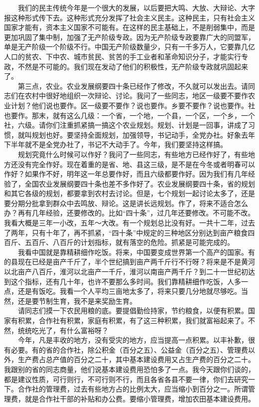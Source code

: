 \documentclass[cn,11pt,chinese]{elegantbook}
\begin{document}
　　我们的民主传统今年是一个很大的发展，以后要把大鸣、大放、大辩论、大字报这种形式传下去。这种形式充分发挥了社会主义民主。这种民主，只有社会主义国家才能有，资本主义国家不可能有。在这样的民主基础上，不是削弱集中，而是更加巩固了集中制，加强了无产阶级专政。因为无产阶级专政要靠广大的同盟军，单是无产阶级一个阶级不行。中国无产阶级数量少，只有一千多万人，它要靠几亿人口的贫农、下中农、城市贫民、贫苦的手工业者和革命知识分子，才能实行专政，不然是不可能的。我们现在发动了他们的积极性，无产阶级专政就巩固起来了。\\
　　第三点，农业。农业发展纲要四十条已经作了修改，不久就可以发出去。请同志们在农村中很好地组织一次辩论、讨论。我问了一些同志，地区一级要不要作农业计划？他们说也要作。区一级要不要作？说也要作。乡要不要作？说也要作。社也要作。那末，就有这么几级：一个省，一个地，一个县，一个区，一个乡，一个社，六级。请你们注重抓紧搞一搞这个农业规划。规划、计划是一回事，讲成了习惯，就叫规划也好。要坚持全面规划，加强领导，书记动手，全党办社。好象去年下半年就不是全党办社了，书记不大动手了。今年，我们要坚持这样搞。\\
　　规划究竟什么时候可以作好？我问了一些同志，有些地方已经作好了，有些地方还没有完全作好。现在着重的是省、地、县这三级，是不是在今冬或者明春可以作好？如果作不好，明年这一年总要作好，而且六级都要作好。因为我们有几年经验了，全国农业发展纲要四十条也差不多作好了。农业发展纲要四十条，省的规划和其它各级的规划，都要拿到农村去讨论。但是，七个规划一起讨论太多了，还是要分期分批拿到群众中去鸣放、辩论。这是讲长远规划。作了，将来不适合怎么办？再有几年经验，还要修改的。比如“四十条”，过几年还要修改。不可能不改。我看大概是三年一小改，五年～大改。有一个规划总比没有好。一共十二年，过去了两年，只有十年了，再不抓紧，“四十条”中规定的三种地区分别达到亩产粮食四百斤、五百斤、八百斤的计划指标，就有落空的危险。抓紧是可能完成的。\\
　　我看中国就是靠精耕细作吃饭。将来，中国要变成世界第一个高产的国家。有的县现在已经是亩产千斤了，半个世纪搞到亩产两千斤行不行呀？将来是不是黄河以北亩产八百斤，淮河以北亩产一千斤，淮河以南亩产两千斤？到二十一世纪初达到这个指标，还有几十年，也许不要那么多时间。我们靠精耕细作吃饭，人多一点，还是有饭吃。我看一个人平均三亩地太多了，将来只要几分地就尽够吃。当然，还是要节制生育，我不是来奖励生育。\\
　　请同志们摸一下农民用粮的底。要提倡勤俭持家，节约粮食，以便有积累。国家有积累，合作社有积累，家庭有积累，有了这三种积累，我们就富裕起来了。不然，统统吃光了，有什么富裕呀？\\
　　今年，凡是丰收的地方，没有受灾的地方，应当提高一点积累。以丰补歉，很有必要。有的省的合作社，除公积金（百分之五）、公益金（百分之五）、管理费以外，生产费占总产值的百分之二十，其中基本建设费用又占生产费的百分之二十。我跟别的省的同志商量，他们说基本建设费用恐怕多了一点。我今天跟你们谈的，都是建议性质，可行则行，不可行则不行，而且各省各县不要一律，你们去研究一下。合作社的管理费，过去有些地方占的比例太大，应当缩小到百分之一。所谓管理费，就是合作社干部的补贴和办公费。要缩小管理费，增加农田基本建设费用。\\
\end{document}
